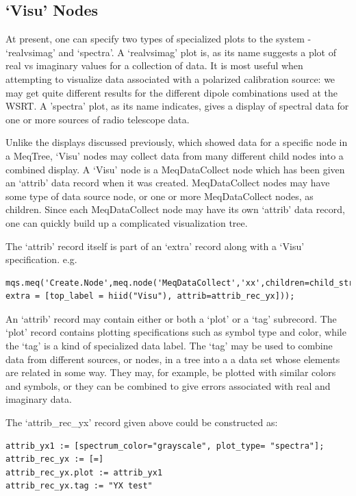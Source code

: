 \documentclass[10pt]{article}
\begin{document}
\subsection {`Visu' Nodes}

At present, one can specify two types of specialized plots to the
system - `realvsimag' and `spectra'. A `realvsimag' plot is, as
its name suggests a plot of real vs imaginary values for a collection
of data. It is most useful when attempting to visualize data 
associated with a polarized calibration source: we may get quite
different results for the different dipole combinations used at
the WSRT. A 'spectra' plot, as its name indicates, gives
a display of spectral data for one or more sources of radio
telescope data. 

Unlike the displays discussed previously, which
showed data for a specific node in a MeqTree, `Visu' nodes may
collect data from many different child nodes into a combined
display. A `Visu' node is a MeqDataCollect node which has been
given an `attrib' data record when it was created. MeqDataCollect nodes
may have some type of data source node, or one or more MeqDataCollect nodes, 
as children. Since each MeqDataCollect node may have its own `attrib' data 
record, one can quickly build up a complicated visualization tree. 

The `attrib' record itself is part of an `extra' record along with
a `Visu' specification. e.g.

\begin{verbatim}
mqs.meq('Create.Node',meq.node('MeqDataCollect','xx',children=child_str1,
extra = [top_label = hiid("Visu"), attrib=attrib_rec_yx]));
\end{verbatim}

An `attrib' record may contain either or both a `plot' or
a `tag' subrecord. The `plot' record contains plotting specifications 
such as symbol type and color, while
the `tag' is a kind of specialized data label. The `tag' may be used
to combine data from different sources, or nodes, in a tree into a
a data set whose elements are related in some way. They may, for example, 
be plotted with similar colors and symbols, or they can be combined to
give errors associated with real and imaginary data. 

The `attrib\_rec\_yx' record given above could
be constructed as:

\begin{verbatim}
attrib_yx1 := [spectrum_color="grayscale", plot_type= "spectra"];
attrib_rec_yx := [=]
attrib_rec_yx.plot := attrib_yx1
attrib_rec_yx.tag := "YX test"
\end{verbatim}
\end{document}
